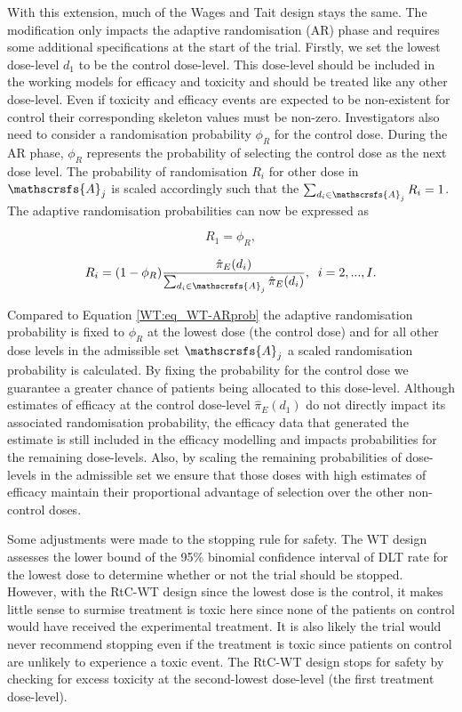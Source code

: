 With this extension, much of the Wages and Tait design stays the same. The modification only impacts the adaptive randomisation (AR) phase and requires some additional specifications at the start of the trial. Firstly, we set the lowest dose-level $d_1$ to be the control dose-level. This dose-level should be included in the working models for efficacy and toxicity and should be treated like any other dose-level. Even if toxicity and efficacy events are expected to be non-existent for control their corresponding skeleton values must be non-zero. Investigators also need to consider a randomisation probability $\phi_R$ for the control dose. During the AR phase, $\phi_R$ represents the probability of selecting the control dose as the next dose level. The probability of randomisation $R_i$ for other dose in $\mathscrsfs{A}_j$ is scaled accordingly such that the $\sum_{d_i \in \mathscrsfs{A}_j} R_i = 1$. The adaptive randomisation probabilities can now be expressed as 

\begin{equation}
	R_1 = \phi_R,
\end{equation}

\begin{equation}
	R_i = (1-\phi_R)\frac{\hat{\pi}_E(d_i)}{\sum_{d_i \in \mathscrsfs{A}_j}\hat{\pi}_E(d_i)}, \; \; i=2,...,I. 
\end{equation}

Compared to Equation \ref{WT:eq_WT-ARprob} the adaptive randomisation probability is fixed to $\phi_R$ at the lowest dose (the control dose) and for all other dose levels in the admissible set $\mathscrsfs{A}_j$ a scaled randomisation probability is calculated. By fixing the probability for the control dose we guarantee a greater chance of patients being allocated to this dose-level. Although estimates of efficacy at the control dose-level $\hat{\pi}_E(d_1)$ do not directly impact its associated randomisation probability, the efficacy data that generated the estimate is still included in the efficacy modelling and impacts probabilities for the remaining dose-levels. Also, by scaling the remaining probabilities of dose-levels in the admissible set we ensure that those doses with high estimates of efficacy maintain their proportional advantage of selection over the other non-control doses.

Some adjustments were made to the stopping rule for safety. The WT design assesses the lower bound of the 95\% binomial confidence interval of DLT rate for the lowest dose to determine whether or not the trial should be stopped. However, with the RtC-WT design since the lowest dose is the control, it makes little sense to surmise treatment is toxic here since none of the patients on control would have received the experimental treatment. It is also likely the trial would never recommend stopping even if the treatment is toxic since patients on control are unlikely to experience a toxic event. The RtC-WT design stops for safety by checking for excess toxicity at the second-lowest dose-level (the first treatment dose-level).

